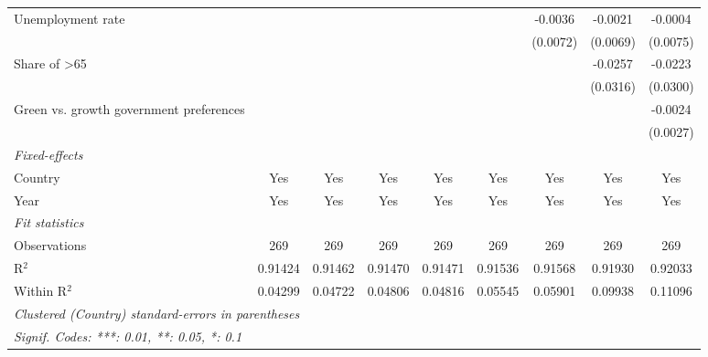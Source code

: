 \begin{table}[htbp]
\begin{tabular}{lcccccccc}
      Unemployment rate                                  &               &               &               &               &               & -0.0036      & -0.0021  & -0.0004\\   
                                                         &               &               &               &               &               & (0.0072)     & (0.0069) & (0.0075)\\   
      Share of >65                                       &               &               &               &               &               &              & -0.0257  & -0.0223\\   
                                                         &               &               &               &               &               &              & (0.0316) & (0.0300)\\   
      Green vs. growth government preferences            &               &               &               &               &               &              &          & -0.0024\\   
                                                         &               &               &               &               &               &              &          & (0.0027)\\   
      \midrule
      \emph{Fixed-effects}\\
      Country                                            & Yes           & Yes           & Yes           & Yes           & Yes           & Yes          & Yes      & Yes\\  
      Year                                               & Yes           & Yes           & Yes           & Yes           & Yes           & Yes          & Yes      & Yes\\  
      \midrule
      \emph{Fit statistics}\\
      Observations                                       & 269           & 269           & 269           & 269           & 269           & 269          & 269      & 269\\  
      R$^2$                                              & 0.91424       & 0.91462       & 0.91470       & 0.91471       & 0.91536       & 0.91568      & 0.91930  & 0.92033\\  
      Within R$^2$                                       & 0.04299       & 0.04722       & 0.04806       & 0.04816       & 0.05545       & 0.05901      & 0.09938  & 0.11096\\  
      \midrule \midrule
      \multicolumn{9}{l}{\emph{Clustered (Country) standard-errors in parentheses}}\\
      \multicolumn{9}{l}{\emph{Signif. Codes: ***: 0.01, **: 0.05, *: 0.1}}\\
   \end{tabular}
\end{table}


